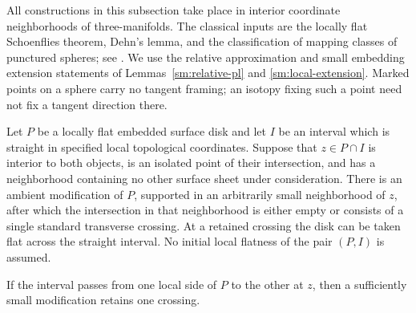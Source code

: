 All constructions in this subsection take place in interior coordinate
neighborhoods of three-manifolds. The classical inputs are the locally
flat Schoenflies theorem, Dehn's lemma, and the classification of
mapping classes of punctured spheres; see
\cite{Brown1960,Brown1962,Papakyriakopoulos1957,FarbMargalit2012}.
We use the relative approximation and small embedding extension
statements of Lemmas~\ref{sm:relative-pl} and
\ref{sm:local-extension}. Marked points on a sphere carry no tangent
framing; an isotopy fixing such a point need not fix a tangent
direction there.

\begin{lemma}\label{lt:clean-crossing}
Let $P$ be a locally flat embedded surface disk and let $I$ be an interval
which is straight in specified local topological coordinates.  Suppose
that $z\in P\cap I$ is interior to both objects, is an isolated point of
their intersection, and has a neighborhood containing no other surface
sheet under consideration.  There is an ambient modification of $P$,
supported in an arbitrarily small neighborhood of $z$, after which the
intersection in that neighborhood is either empty or consists of a
single standard transverse crossing.  At a retained crossing the disk
can be taken flat across the straight interval.  No initial local
flatness of the pair $(P,I)$ is assumed.

If the interval passes from one local side of $P$ to the other at $z$,
then a sufficiently small modification retains one crossing.
\end{lemma}

